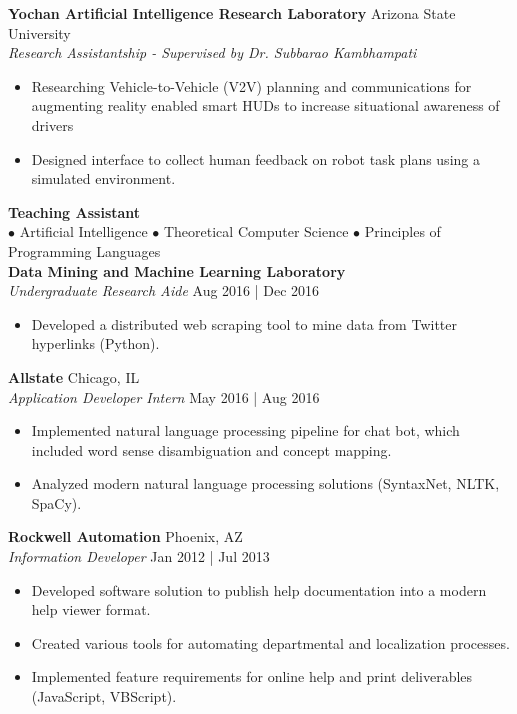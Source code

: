 \documentclass[a4paper]{article}
\begin{document}
\textbf{Yochan Artificial Intelligence Research Laboratory} \hfill Arizona State University\\
\textit{Research Assistantship - Supervised by  Dr. Subbarao Kambhampati} \hfill \\
\vspace{-1mm}
\begin{itemize} \itemsep 1pt
	\item Researching Vehicle-to-Vehicle (V2V) planning and communications for augmenting reality enabled smart HUDs to increase situational awareness of drivers
    \item Designed interface to collect human feedback on robot task plans using a simulated environment.
\end{itemize}
\textbf{Teaching Assistant} \hfill \\
\vspace{1mm}
\hspace{.5cm}$\bullet$ Artificial Intelligence \-  $\bullet$ Theoretical Computer Science \-$\bullet$ Principles of Programming Languages\\
\vspace{3mm}
\textbf{Data Mining and Machine Learning Laboratory} \hfill \\
\textit{Undergraduate Research Aide} \hfill Aug 2016 | Dec 2016\\
\vspace{-1mm}
\begin{itemize} \itemsep 1pt
	\item Developed a distributed web scraping tool to mine data from Twitter hyperlinks (Python).
\end{itemize}

\textbf{Allstate} \hfill Chicago, IL\\
\textit{Application Developer Intern} \hfill May 2016 | Aug 2016\\
\vspace{-1mm}
\begin{itemize} \itemsep 1pt
	\item Implemented natural language processing pipeline for chat bot, which included word sense disambiguation and concept mapping.
	\item Analyzed modern natural language processing solutions (SyntaxNet, NLTK, SpaCy).
\end{itemize}

\textbf{Rockwell Automation} \hfill Phoenix, AZ\\
\textit{Information Developer} \hfill Jan 2012 | Jul 2013\\
\vspace{-1mm}
\begin{itemize} \itemsep 1pt
	\item Developed software solution to publish help documentation into a modern help viewer format.
	\item Created various tools for automating departmental and localization processes.
	\item Implemented feature requirements for online help and print deliverables (JavaScript, VBScript).
\end{itemize}
\end{document}
